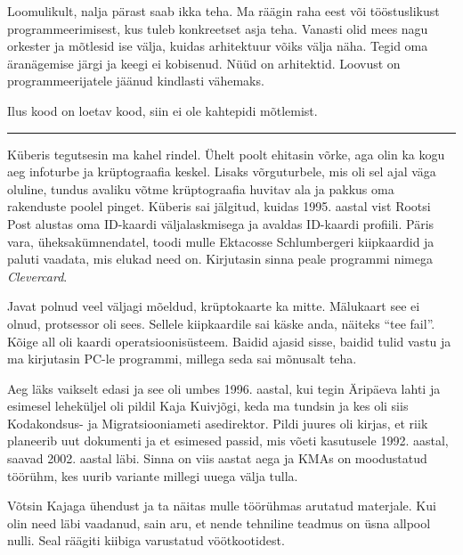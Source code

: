 
Loomulikult, nalja pärast saab ikka teha. Ma räägin raha 
eest või tööstuslikust programmeerimisest, kus tuleb konkreetset asja teha. 
Vanasti olid mees nagu orkester ja mõtlesid ise välja, kuidas arhitektuur 
võiks välja näha. Tegid oma äranägemise järgi ja keegi ei kobisenud. Nüüd 
on arhitektid. Loovust on 
programmeerijatele jäänud kindlasti vähemaks. 


Ilus kood on loetav kood, siin ei ole kahtepidi mõtlemist. 

\bigskip
\noindent\rule{.3\textwidth}{.7pt}
\bigskip


Küberis tegutsesin ma kahel rindel. Ühelt poolt ehitasin võrke, 
aga olin ka kogu aeg infoturbe ja krüptograafia keskel. Lisaks 
võrguturbele, mis oli sel ajal väga oluline, tundus avaliku võtme 
krüptograafia huvitav ala ja pakkus oma rakenduste poolel pinget. 
Küberis sai jälgitud, kuidas 1995. aastal vist Rootsi Post alustas oma 
ID-kaardi väljalaskmisega ja avaldas ID-kaardi profiili. Päris vara, 
üheksakümnendatel, toodi mulle Ektacosse Schlumbergeri 
kiipkaardid ja paluti vaadata, mis elukad need on. 
Kirjutasin sinna peale programmi nimega \emph{Clevercard}.


Javat polnud veel väljagi mõeldud, 
krüptokaarte ka mitte. Mälukaart see ei olnud, protsessor 
oli sees. Sellele kiipkaardile sai käske anda, näiteks \enquote{tee fail}. Kõige all oli 
kaardi operatsioonisüsteem. Baidid ajasid sisse, baidid tulid vastu ja ma kirjutasin 
PC-le programmi, millega seda sai mõnusalt teha. 

Aeg läks vaikselt edasi ja see oli umbes 1996.
aastal, kui tegin Äripäeva lahti ja esimesel leheküljel oli pildil Kaja 
Kuivjõgi, keda ma tundsin ja kes 
oli siis Kodakondsus- ja Migratsiooniameti asedirektor. Pildi juures oli kirjas, et riik 
planeerib uut dokumenti ja et esimesed passid, mis võeti kasutusele 1992. aastal, saavad 2002. aastal läbi. 
Sinna on viis aastat aega ja KMAs on moodustatud töörühm, kes 
uurib variante millegi uuega välja tulla. 

Võtsin Kajaga ühendust ja ta 
näitas mulle töörühmas arutatud materjale. Kui olin need 
läbi vaadanud, sain aru, et nende tehniline teadmus on üsna allpool 
nulli. Seal räägiti kiibiga varustatud vöötkootidest. 

